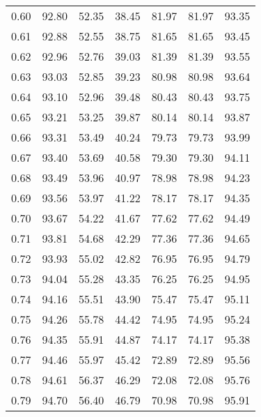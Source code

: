 \begin{tabular}{|c|c|c|c|c|c|c|}
      0.60 &     92.80 &     52.35 &      38.45 &   81.97 &      81.97 &         93.35 \\
      0.61 &     92.88 &     52.55 &      38.75 &   81.65 &      81.65 &         93.45 \\
      0.62 &     92.96 &     52.76 &      39.03 &   81.39 &      81.39 &         93.55 \\
      0.63 &     93.03 &     52.85 &      39.23 &   80.98 &      80.98 &         93.64 \\
      0.64 &     93.10 &     52.96 &      39.48 &   80.43 &      80.43 &         93.75 \\
      0.65 &     93.21 &     53.25 &      39.87 &   80.14 &      80.14 &         93.87 \\
      0.66 &     93.31 &     53.49 &      40.24 &   79.73 &      79.73 &         93.99 \\
      0.67 &     93.40 &     53.69 &      40.58 &   79.30 &      79.30 &         94.11 \\
      0.68 &     93.49 &     53.96 &      40.97 &   78.98 &      78.98 &         94.23 \\
      0.69 &     93.56 &     53.97 &      41.22 &   78.17 &      78.17 &         94.35 \\
      0.70 &     93.67 &     54.22 &      41.67 &   77.62 &      77.62 &         94.49 \\
      0.71 &     93.81 &     54.68 &      42.29 &   77.36 &      77.36 &         94.65 \\
      0.72 &     93.93 &     55.02 &      42.82 &   76.95 &      76.95 &         94.79 \\
      0.73 &     94.04 &     55.28 &      43.35 &   76.25 &      76.25 &         94.95 \\
      0.74 &     94.16 &     55.51 &      43.90 &   75.47 &      75.47 &         95.11 \\
      0.75 &     94.26 &     55.78 &      44.42 &   74.95 &      74.95 &         95.24 \\
      0.76 &     94.35 &     55.91 &      44.87 &   74.17 &      74.17 &         95.38 \\
      0.77 &     94.46 &     55.97 &      45.42 &   72.89 &      72.89 &         95.56 \\
      0.78 &     94.61 &     56.37 &      46.29 &   72.08 &      72.08 &         95.76 \\
      0.79 &     94.70 &     56.40 &      46.79 &   70.98 &      70.98 &         95.91 \\

\end{tabular}
